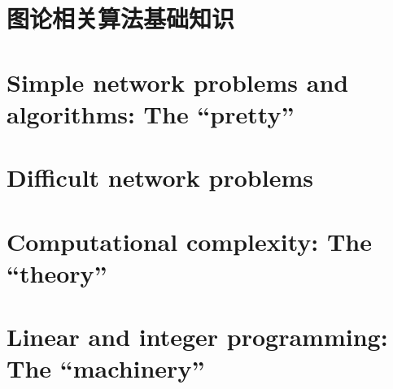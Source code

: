 \documentclass[twoside, openright]{book}
\begin{document}
\frontmatter
	\maketitle
	\cleardoublepage
	\cleardoublepage%
	\cleardoublepage%
\mainmatter 
	\part{图论相关算法基础知识}
		

	\part{Simple network problems and algorithms: The “pretty”}%
		
		
		
		
			

	\part{Difficult network problems} %

%		
%		
%		
%		
%		
%		
%		
	\part{Computational complexity: The “theory”}
		
		
	\part{Linear and integer programming: The “machinery”}
		
		
\end{document}
